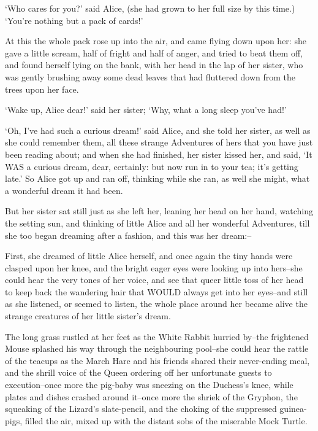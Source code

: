 \documentclass[12pt]{book}
\begin{document}
  `Who cares for you?' said Alice, (she had grown to her full
size by this time.)  `You're nothing but a pack of cards!'

  At this the whole pack rose up into the air, and came flying
down upon her:  she gave a little scream, half of fright and half
of anger, and tried to beat them off, and found herself lying on
the bank, with her head in the lap of her sister, who was gently
brushing away some dead leaves that had fluttered down from the
trees upon her face.

  `Wake up, Alice dear!' said her sister; `Why, what a long
sleep you've had!'

  `Oh, I've had such a curious dream!' said Alice, and she told
her sister, as well as she could remember them, all these strange
Adventures of hers that you have just been reading about; and
when she had finished, her sister kissed her, and said, `It WAS a
curious dream, dear, certainly:  but now run in to your tea; it's
getting late.'  So Alice got up and ran off, thinking while she
ran, as well she might, what a wonderful dream it had been.

  But her sister sat still just as she left her, leaning her
head on her hand, watching the setting sun, and thinking of
little Alice and all her wonderful Adventures, till she too began
dreaming after a fashion, and this was her dream:--

  First, she dreamed of little Alice herself, and once again the
tiny hands were clasped upon her knee, and the bright eager eyes
were looking up into hers--she could hear the very tones of her
voice, and see that queer little toss of her head to keep back
the wandering hair that WOULD always get into her eyes--and
still as she listened, or seemed to listen, the whole place
around her became alive the strange creatures of her little
sister's dream.

  The long grass rustled at her feet as the White Rabbit hurried
by--the frightened Mouse splashed his way through the
neighbouring pool--she could hear the rattle of the teacups as
the March Hare and his friends shared their never-ending meal,
and the shrill voice of the Queen ordering off her unfortunate
guests to execution--once more the pig-baby was sneezing on the
Duchess's knee, while plates and dishes crashed around it--once
more the shriek of the Gryphon, the squeaking of the Lizard's
slate-pencil, and the choking of the suppressed guinea-pigs,
filled the air, mixed up with the distant sobs of the miserable
Mock Turtle.
\end{document}

